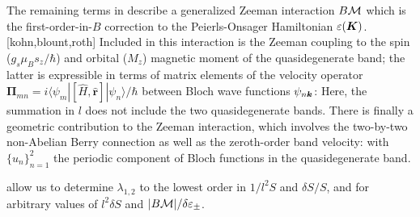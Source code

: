 \documentclass[aps, prb, showpacs, twocolumn, notitlepage, superscriptaddress]{revtex4-1}
\begin{document}


The remaining terms in  describe a generalized Zeeman interaction $B{\cal M}$ which is the first-order-in-$B$ correction to the Peierls-Onsager Hamiltonian $\varepsilon(\boldsymbol{K})$.[kohn,blount,roth] Included in this interaction is the Zeeman coupling to the spin ($g_s\mu_Bs_z/\hbar$) and orbital ($M_z$) magnetic moment of the quasidegenerate band; the latter is expressible in terms of matrix elements of the velocity operator $\boldsymbol{\Pi}_{mn}=i\langle\psi_m|[\hat{H}, \hat{\boldsymbol{r}}]|\psi_n\rangle/\hbar$ between Bloch wave functions $\psi_{n\boldsymbol{k}}$:
Here, the summation in $l$ does not include the two quasidegenerate bands.  There is finally a geometric contribution to the Zeeman interaction, which involves the two-by-two non-Abelian Berry connection  as well as the  zeroth-order band velocity: 
with $\{u_n\}_{n=1}^2$ the periodic component of Bloch functions in the quasidegenerate band. 

 allow us to determine $\lambda_{1,2}$ to the lowest order  in $1/l^2S$ and $\delta S/S$, and for arbitrary values of $l^2\delta S$ and $|B{\cal M}|/\delta \varepsilon_{\pm}$.

\end{document}

